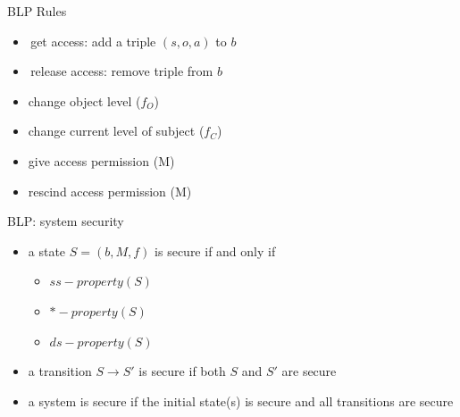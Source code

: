 \documentclass{beamer}
\begin{document}
\begin{frame}{BLP Rules}
  \begin{itemize}
    \item get access: add a triple $(s,o,a)$ to $b$
    \item<2-> release access: remove triple from $b$
    \item<3-> change object level ($f_O$)
    \item<4-> change current level of subject ($f_C$)
    \item<5-> give access permission (M) 
    \item<6-> rescind access permission (M) 
  \end{itemize}
\end{frame}

\begin{frame}{BLP: system security}
  \begin{itemize}
  \item a state $S=(b,M,f)$ is secure if and only if 
    \begin{itemize}
      \item $ss-property(S)$
      \item $*-property(S)$
      \item $ds-property(S)$
    \end{itemize}
  \item a transition $S \rightarrow S'$ is secure if
    both $S$ and $S'$ are secure
  \item a system is secure if the initial state(s) is secure
    and all transitions are secure
  \end{itemize}
\end{frame}

\end{document}
